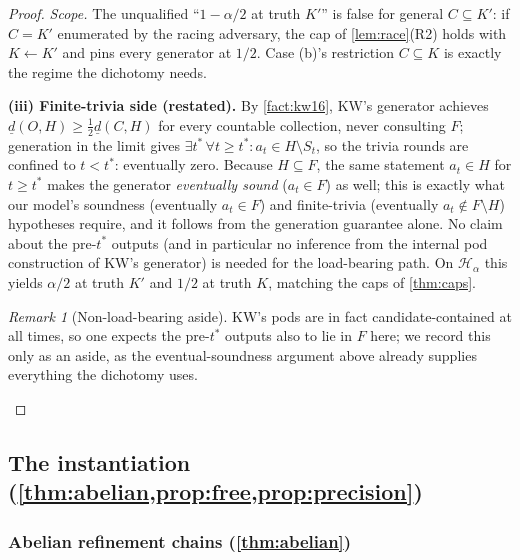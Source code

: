 \documentclass[11pt]{article}
\numberwithin{equation}{section}
\newcommand{\mc}[1]{\mathcal{#1}}
\newcommand{\Amb}{F}
\newcommand{\Val}{H}
\newcommand{\Hcal}{\mc{H}}
\newcommand{\Hfam}{\Hcal_{\alpha}}
\newcommand{\Seen}{S}
\newcommand{\Out}{O}
\newcommand{\Core}{C}
\newcommand{\dlow}[2]{\underline{d}(#1,#2)}
\theoremstyle{plain}
\theoremstyle{definition}
\theoremstyle{remark}
\newtheorem{remark}[theorem]{Remark}
\begin{document}
\begin{proof}
\emph{Scope.} The unqualified ``$1 - \alpha/2$ at truth $K'$'' is false for general $\Core
\subseteq K'$: if $\Core = K'$ enumerated by the racing adversary, the cap of
\cref{lem:race}(R2) holds with $K \leftarrow K'$ and pins every generator at $1/2$. Case (b)'s
restriction $\Core \subseteq K$ is exactly the regime the dichotomy needs.

\medskip\noindent\textbf{(iii) Finite-trivia side (restated).}\quad
By \cref{fact:kw16}, KW's generator achieves $\dlow{\Out}{\Val} \ge \tfrac12
\dlow{\Core}{\Val}$ for every countable collection, never consulting $\Amb$; generation in the
limit gives $\exists t^*\, \forall t \ge t^*: a_t \in \Val \setminus \Seen_t$, so the trivia
rounds are confined to $t < t^*$: eventually zero. Because $\Val \subseteq \Amb$, the same
statement $a_t \in \Val$ for $t \ge t^*$ makes the generator \emph{eventually sound} ($a_t \in
\Amb$) as well; this is exactly what our model's soundness (eventually $a_t \in \Amb$) and
finite-trivia (eventually $a_t \notin \Amb \setminus \Val$) hypotheses require, and it follows
from the generation guarantee alone. No claim about the pre-$t^*$ outputs (and in particular
no inference from the internal pod construction of KW's generator) is needed for the
load-bearing path. On $\Hfam$ this yields $\alpha/2$ at truth $K'$ and $1/2$ at truth $K$,
matching the caps of \cref{thm:caps}.

\begin{remark}[Non-load-bearing aside]\label{rmk:pods}
KW's pods are in fact candidate-contained at all times, so one expects the pre-$t^*$ outputs
also to lie in $\Amb$ here; we record this only as an aside, as the eventual-soundness
argument above already supplies everything the dichotomy uses.
\end{remark}
\end{proof}

\subsection{The instantiation (\texorpdfstring{\cref{thm:abelian,prop:free,prop:precision}}{Theorems 7--9})}
\label{app:instantiation}

\subsubsection{Abelian refinement chains (\texorpdfstring{\cref{thm:abelian}}{Theorem 7})}
\label{app:abelian}
\end{document}
